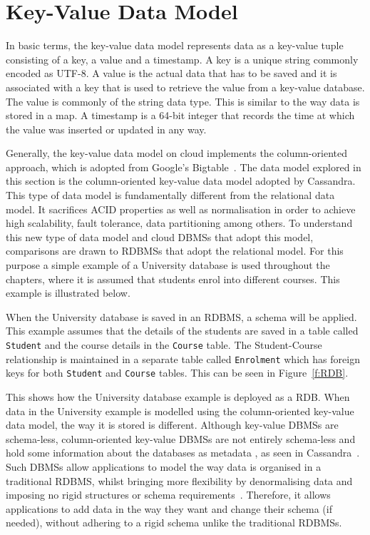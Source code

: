 \section{Key-Value Data Model}\label{s:key-value-data-model}
In basic terms,   the key-value data model represents data as a key-value tuple
consisting of a key,   a value and a timestamp.  A key is a unique string
commonly encoded as UTF-8.  A value is the actual data that has to be saved and
it is associated with a key that is used to retrieve the value from a key-value
database.  The value is commonly of the string data type.
This is similar to the way data is stored in a map.  A timestamp is a 64-bit
integer that records the time at which the value was inserted or updated in any
way.

Generally,   the key-value data model on cloud implements the column-oriented
approach,   which is adopted from Google's Bigtable~\citep{bigtable}.
The data model explored in this section is the column-oriented key-value data
model adopted by Cassandra.  This type of data model is fundamentally different
from the relational data model.  It sacrifices ACID properties as well as
normalisation in order to achieve high scalability, fault tolerance,   data
partitioning among others.  To understand this new type
of data model and cloud \acp{DBMS} that adopt this model,   comparisons are
drawn to \acp{RDBMS} that adopt the relational model.  For this purpose a simple
example of a University database is used throughout the chapters,   where it is
assumed that students enrol into different courses.  This example is illustrated
below.

When the University database is saved in an \ac{RDBMS},   a schema will be
applied. This example assumes that the details of the students are saved in a
table called \texttt{Student} and the course details in the \texttt{Course}
table. The Student-Course relationship is maintained in a separate table called
\texttt{Enrolment} which has foreign keys for both \texttt{Student} and
\texttt{Course} tables.  This can be seen in Figure~\ref{f:RDB}. 
 
 

This shows how the University database example is deployed as a \ac{RDB}.  When
data in the University example is modelled using the column-oriented key-value
data model,   the way it is stored is different.
Although key-value \acp{DBMS} are schema-less,   column-oriented key-value
\acp{DBMS} are not entirely schema-less and hold some information about the
databases as metadata , as seen in Cassandra~\citep{datastaxDataModel}.
Such \acp{DBMS} allow applications to model the way data is organised in a
traditional \ac{RDBMS}, whilst bringing more flexibility by denormalising data
and imposing no rigid structures or schema
requirements~\citep{datastaxDataModel,BOOK,cassandra}.
Therefore,   it allows applications to add data in the way they want and change
their schema (if needed),   without adhering to a rigid schema unlike the
traditional \acp{RDBMS}.

